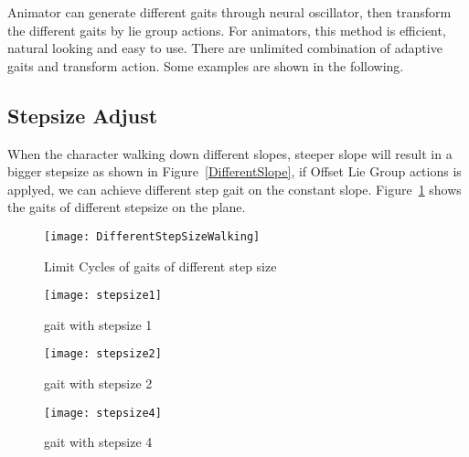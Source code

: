 Animator can generate different gaits through neural oscillator, then transform the different gaits by lie group actions.
For animators, this method is efficient, natural looking and easy to use.
There are unlimited combination of adaptive gaits and transform action.
Some examples are shown in the following.


\subsection{Stepsize Adjust}
When the character walking down different slopes, steeper slope will result in a bigger stepsize as shown in Figure~\ref{DifferentSlope}, if Offset Lie Group actions is applyed, we can achieve different step gait on the constant slope.
Figure~\ref{fig:differentstepsizeonplaine} shows the gaits of different stepsize on the plane.

\begin{figure}[!htbp]
  \begin{center}
      \texttt{[image: DifferentStepSizeWalking]}
    \caption{Limit Cycles of gaits of different step size}
    \label{fig:differentstepsizeonplaine}
\end{center}
\end{figure}



\begin{figure}[!htbp]
  \begin{center}
      \texttt{[image: stepsize1]}
    \caption{gait with stepsize 1}
    \label{fig:ssp1}
\end{center}
\end{figure}

\begin{figure}[!htbp]
  \begin{center}
      \texttt{[image: stepsize2]}
    \caption{gait with stepsize 2}
    \label{fig:ssp2}
\end{center}
\end{figure}

\begin{figure}[!htbp]
  \begin{center}
      \texttt{[image: stepsize4]}
    \caption{gait with stepsize 4}
    \label{fig:ssp3}
\end{center}
\end{figure}







